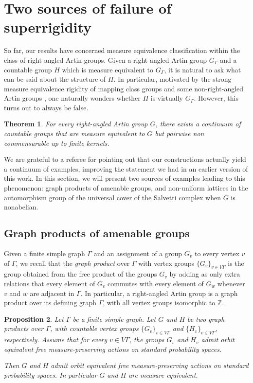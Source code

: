 \documentclass[JEP,XML,SOM,Unicode,NoFloatCountersInSection,published]{cedram}
\theoremstyle{plain}
\newtheorem{theo}{Theorem}[section]
\newtheorem{prop}[theo]{Proposition}
\theoremstyle{definition}
\begin{document}
\section{Two sources of failure of superrigidity}

So far, our results have concerned measure equivalence classification within the class of right-angled Artin groups. Given a right-angled Artin group $G_\Gamma$ and a countable group $H$ which is measure equivalent to $G_\Gamma$, it is natural to ask what can be said about the structure of $H$. In particular, motivated by the strong measure equivalence rigidity of mapping class groups \cite{Kid} and some non-right-angled Artin groups \cite{HH}, one naturally wonders whether $H$ is virtually $G_\Gamma$. However, this turns out to always be false.

\begin{theo}\label{theo:non-rigidity}
For every right-angled Artin group $G$, there exists a continuum of countable groups that are measure equivalent to $G$ but pairwise non commensurable up to finite kernels.
\end{theo}

We are grateful to a referee for pointing out that our constructions actually yield a continuum of examples, improving the statement we had in an earlier version of this work. In this section, we will present two sources of examples leading to this phenomenon: graph products of amenable groups, and non-uniform lattices in the automorphism group of the universal cover of the Salvetti complex when $G$ is nonabelian.

\subsection{Graph products of amenable groups}

Given a finite simple graph $\Gamma$ and an assignment of a group $G_v$ to every vertex $v$ of $\Gamma$, we recall that the \emph{graph product} over $\Gamma$ with vertex groups $\{G_v\}_{v\in V\Gamma}$ is the group obtained from the free product of the groups $G_v$ by adding as only extra relations that every element of $G_v$ commutes with every element of $G_w$ whenever $v$ and $w$ are adjacent in $\Gamma$. In particular, a right-angled Artin group is a graph product over its defining graph $\Gamma$, with all vertex groups isomorphic to $\mathbb{Z}$.

\begin{prop}\label{prop:graph-product}
Let $\Gamma$ be a finite simple graph. Let $G$ and $H$ be two graph products over $\Gamma$, with countable vertex groups $\{G_v\}_{v\in V\Gamma}$ and $\{H_v\}_{v\in V\Gamma}$, respectively. Assume that for every $v\in V\Gamma$, the groups $G_v$ and $H_v$ admit orbit equivalent free measure-preserving actions on standard probability spaces.

Then $G$ and $H$ admit orbit equivalent free measure-preserving actions on standard probability spaces. In particular $G$ and $H$ are measure equivalent.
\end{prop}
\end{document}
